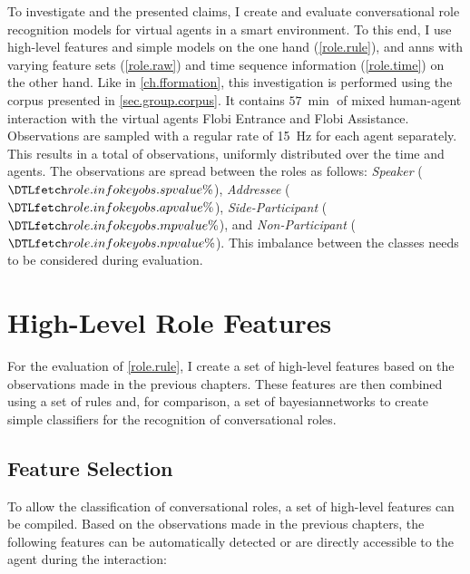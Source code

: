 \begin{hyp3}
    \label{role.time}
    \hyproletime
\end{hyp3}
To investigate  and the presented claims, I create and evaluate \gls{conversational role} recognition models for \glspl{virtual agent} in a \gls{smart environment}.
To this end, I use high-level features and simple models on the one hand (\cref{role.rule}), and \glspl{ann} with varying feature sets (\cref{role.raw}) and time sequence information (\cref{role.time}) on the other hand.
Like in \cref{ch.fformation}, this investigation is performed using the corpus presented in \cref{sec.group.corpus}.
It contains \(\SI{57}{\min}\) of mixed human-agent interaction with the \glspl{virtual agent} \gls{Flobi Entrance} and \gls{Flobi Assistance}.
Observations are sampled with a regular rate of \SI{15}{\Hz} for each agent separately.
This results in a total of  observations, uniformly distributed over the time and agents.
The observations are spread between the roles as follows: \emph{Speaker} (\(\inidata{role.info}{obs.sp}\%\)), \emph{Addressee} (\(\inidata{role.info}{obs.ap}\%\)), \emph{Side-Participant} (\(\inidata{role.info}{obs.mp}\%\)), and \emph{Non-Participant} (\(\inidata{role.info}{obs.np}\%\)).
This imbalance between the classes needs to be considered during evaluation.

\section{High-Level Role Features}

For the evaluation of \cref{role.rule}, I create a set of high-level features based on the observations made in the previous chapters.
These features are then combined using a set of rules and, for com\-pa\-ri\-son, a set of \glspl{bayesiannetwork} to create simple classifiers for the recognition of \glspl{conversational role}.

\subsection{Feature Selection}\label{sec:role-rule-features}

To allow the classification of \glspl{conversational role}, a set of high-level features can be compiled.
Based on the observations made in the previous chapters, the following features can be automatically detected or are directly accessible to the agent during the interaction:


